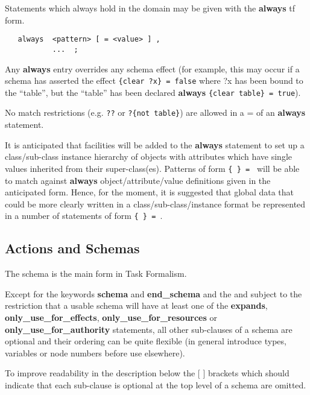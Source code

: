 Statements which always hold in the domain may be given
with the {\bf always} {\sc tf} form.

\begin{verbatim}
   always  <pattern> [ = <value> ] ,
           ...  ;
\end{verbatim}

Any {\bf always} entry overrides any schema effect (for example, this may
occur if a schema has asserted the effect {\tt \{clear ?x\} = false} where ?x
has been bound to the ``table'', but the ``table'' has been declared {\bf
always} {\tt \{clear table\} = true}).

No match restrictions (e.g. {\tt ??} or {\tt ?\{not table\}}) are allowed in
a  =  of an {\bf always} statement.

It is anticipated that facilities will be added to the {\bf always}
statement to set up a class/sub-class instance hierarchy of objects with
attributes which have single values inherited from their
super-class(es).  Patterns of form {\tt \{ \} =
} will be able to match against {\bf always}
object/attribute/value definitions given in the anticipated form.
Hence, for the moment, it is suggested that global data that could be
more clearly written in a class/sub-class/instance format be represented
in a number of statements of form {\tt \{ \} =
}. 

\subsection{Actions and Schemas}

The schema is the main form in Task Formalism.

Except for the keywords {\bf schema} and {\bf end\_schema} and the
 and subject to the restriction that a usable schema will
have at least one of the {\bf expands}, {\bf only\_use\_for\_effects}, {\bf
only\_use\_for\_resources} or {\bf only\_use\_for\_authority} statements, all
other sub-clauses of a schema are optional and their ordering can be quite
flexible (in general introduce types, variables or node numbers before use
elsewhere).

To improve readability in the description below the [ ] brackets which should
indicate that each sub-clause is optional at the top level of a schema are
omitted.

